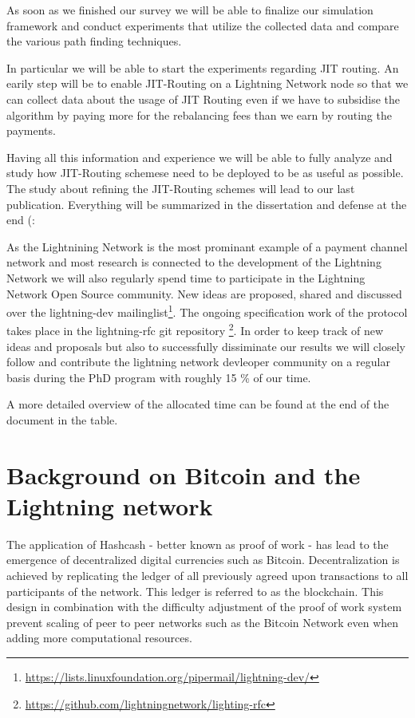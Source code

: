 \documentclass[a4paper]{paper}
\begin{document}
As soon as we finished our survey we will be able to finalize our simulation framework and conduct experiments that utilize the collected data and compare the various path finding techniques.

In particular we will be able to start the experiments regarding JIT routing.
An earily step will be to enable JIT-Routing on a Lightning Network node so that we can collect data about the usage of JIT Routing even if we have to subsidise the algorithm by paying more for the rebalancing fees than we earn by routing the payments.

Having all this information and experience we will be able to fully analyze and study how JIT-Routing schemese need to be deployed to be as useful as possible.
The study about refining the JIT-Routing schemes will lead to our last publication.
Everything will be summarized in the dissertation and defense at the end (: 

As the Lightnining Network is the most prominant example of a payment channel network and most research is connected to the development of the Lightning Network we will also regularly spend time to participate in the Lightning Network Open Source community.
New ideas are proposed, shared and discussed over the lightning-dev mailinglist\footnote{\url{https://lists.linuxfoundation.org/pipermail/lightning-dev/}}.
The ongoing specification work of the protocol takes place in the lightning-rfc git repository \footnote{\url{https://github.com/lightningnetwork/lighting-rfc}}.
In order to keep track of new ideas and proposals but also to successfully dissiminate our results we will closely follow and contribute the lightning network devleoper community on a regular basis during the PhD program with roughly 15 \% of our time.

A more detailed overview of the allocated time can be found at the end of the document in the table.




\appendix
\section{Background on Bitcoin and the Lightning network}
The application of Hashcash \cite{back2002hashcash} - better known as proof of work -  has lead to the emergence of decentralized digital currencies such as Bitcoin\cite{nakamoto2008bitcoin}.
Decentralization is achieved by replicating the ledger of all previously agreed upon transactions to all participants of the network.
This ledger is referred to as the blockchain.
This design in combination with the difficulty adjustment of the proof of work system prevent scaling of peer to peer networks such as the Bitcoin Network even when adding more computational resources.
\end{document}
